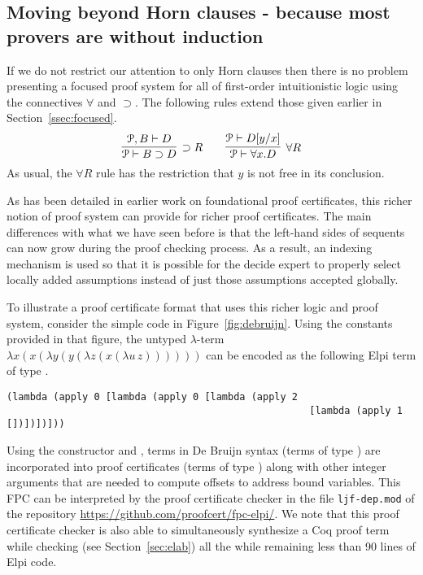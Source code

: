 \subsection{Moving beyond Horn clauses - because most provers are
  without induction}
\label{ssec:beyond}

If we do not restrict our attention to only Horn clauses then there is
no problem presenting a focused proof system for all of first-order
intuitionistic logic using the connectives $\forall$ and $\supset$.
The following rules extend those given earlier in
Section~\ref{ssec:focused}. 
\[
  \infer[\supset R]{\Pscr\vdash B\supset D}{\Pscr, B\vdash D}
  \qquad
  \infer[\forall R]{\Pscr\vdash \forall x.D}{\Pscr\vdash D[y/x]}
\]
As usual, the $\forall R$ rule has the restriction that $y$ is not
free in its conclusion.

As has been detailed in earlier work on foundational proof
certificates, this richer notion of proof system can provide for
richer proof certificates.  The main differences with what we have
seen before is that the left-hand sides of sequents can now grow
during the proof checking process.  As a result, an indexing mechanism
is used so that it is possible for the decide expert to properly
select locally added assumptions instead of just those assumptions
accepted globally.

To illustrate a proof certificate format that uses this richer logic
and proof system, consider the simple \lP code in
Figure~\ref{fig:debruijn}.  Using the constants provided in that
figure, the untyped $\lambda$-term
$\lambda x (x (\lambda y (y (\lambda z (x (\lambda u\,z))))))$ can be
encoded as the following Elpi term of type .
%
\begin{lstlisting}[basicstyle=\ttfamily,language=lprolog]
(lambda (apply 0 [lambda (apply 0 [lambda (apply 2 
                                                    [lambda (apply 1 [])])])]))
\end{lstlisting}
Using the constructor  and , terms in De Bruijn
syntax (terms of type ) are incorporated into proof
certificates (terms of type ) along with other integer
arguments that are needed to compute offsets to address bound
variables.  
%
This FPC can be interpreted by the proof certificate checker in the
file \verb+ljf-dep.mod+ of the repository
\url{https://github.com/proofcert/fpc-elpi/}.  We note that this proof
certificate checker is also able to simultaneously synthesize a Coq
proof term while checking (see Section~\ref{sec:elab}) all the while
remaining less than 90 lines of Elpi code.

